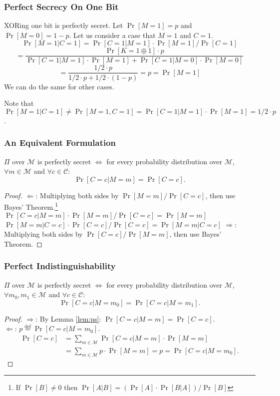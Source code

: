 \begin{frame}\frametitle{Perfect Secrecy On One Bit}

\begin{exampleblock}{XORing one bit is perfectly secret.}
Let $\Pr[M=1] = p$ and $\Pr[M=0] = 1-p$.
Let us consider a case that $M=1$ and $C=1$.
\[ \Pr[M=1 | C=1] = \Pr[C=1 | M=1 ] \cdot \Pr[ M=1 ] / \Pr[C=1] \]
\[ = \frac{\Pr[K = 1\oplus 1] \cdot p }{ \Pr[C=1 | M=1] \cdot \Pr[M=1] + \Pr[C=1 | M=0] \cdot \Pr[M=0]} \]
\[ = \frac{1/2 \cdot p }{ 1/2 \cdot p + 1/2 \cdot (1-p)} = p = \Pr[M=1] \]
We can do the same for other cases.
\end{exampleblock}
Note that $\Pr[M=1 | C=1] \neq \Pr[M=1, C=1] = \Pr[C=1 | M=1] \cdot \Pr[M=1] = 1/2 \cdot p$.
\end{frame}

\begin{frame}\frametitle{An Equivalent Formulation}
\begin{lemma} \label{lem:ps} 
$\Pi$ over $\mathcal{M}$ is perfectly secret $\iff$ for every probability distribution over $\mathcal{M}$, $\forall m \in \mathcal{M}$ and $\forall c \in \mathcal{C}$:
\[ \Pr[C=c | M=m] = \Pr[C=c].\]
\end{lemma}
\begin{proof}
$\Leftarrow$: Multiplying both sides by $\Pr[M=m]/\Pr[C=c]$, then use Bayes' Theorem.\footnote{If $\Pr[B]\neq 0$ then $ \Pr[A|B] = \left( \Pr[A] \cdot \Pr[B|A] \right) / \Pr[B] $} \\
$ \Pr[C=c | M=m] \cdot \Pr[M=m] / \Pr[C=c] = \Pr[M=m]$\\
$ \Pr[M=m | C=c] \cdot \Pr[C=c] / \Pr[C=c] = \Pr[M=m | C=c]$
$\Rightarrow$: Multiplying both sides by $\Pr[C=c]/\Pr[M=m]$, then use Bayes' Theorem.
\end{proof}
\end{frame}
\begin{frame}\frametitle{Perfect Indistinguishability}
\begin{lemma}\label{lem:pi}
$\Pi$ over $\mathcal{M}$ is perfectly secret $\iff$ for every probability distribution over $\mathcal{M}$, $\forall m_0, m_1 \in \mathcal{M}$ and $\forall c \in \mathcal{C}$:
\[ \Pr[C=c | M=m_0] = \Pr[C=c | M=m_1].\]
\end{lemma}
\begin{proof}
$\Rightarrow$: By Lemma \ref{lem:ps}: $\Pr[C=c | M=m] = \Pr[C=c]$. \\
$\Leftarrow$: $p \overset{\text{def}}{=} \Pr[C=c | M=m_0]$.
\[
\begin{split}
	\Pr[C=c] &= \sum_{m \in \mathcal{M}} \Pr[C=c|M=m] \cdot \Pr[M=m] \\
	&= \sum_{m \in \mathcal{M}} p \cdot \Pr[M=m] = p = \Pr[C=c|M=m_0].
\end{split}
\]
\end{proof}
\end{frame}
